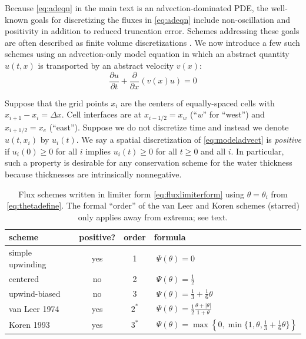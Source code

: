 \documentclass[gmd]{copernicus}   %
\newcommand{\ddt}[1]{\ensuremath{\frac{\partial #1}{\partial t}}}
\newcommand{\ddx}[1]{\ensuremath{\frac{\partial #1}{\partial x}}}
\begin{document}
Because \eqref{eq:adeqn} in the main text is an advection-dominated PDE, the well-known goals for discretizing the fluxes in \eqref{eq:adeqn} include non-oscillation and positivity \citep{HundsdorferVerwer2010} in addition to reduced truncation error.  Schemes addressing these goals are often described as finite volume discretizations \citep{LeVeque}.  We now introduce a few such schemes using an advection-only model equation in which an abstract quantity $u(t,x)$ is transported by an abstract velocity $v(x)$:
\begin{equation} \label{eq:modeladvect}
\ddt{u} + \ddx{}\left(v(x) u\right) = 0
\end{equation}

Suppose that the grid points $x_i$ are the centers of equally-spaced cells with $x_{i+1}-x_i=\Delta x$.  Cell interfaces are at $x_{i-1/2}=x_w$ (``\emph{w}'' for ``west'') and $x_{i+1/2}=x_e$ (``east'').  Suppose we do not discretize time and instead we denote $u(t,x_i)$ by $u_i(t)$.  We say a spatial discretization of \eqref{eq:modeladvect} is \emph{positive} if $u_i(0) \ge 0$ for all $i$ implies $u_i(t)\ge 0$ for all $t\ge 0$ and all $i$.  In particular, such a property is desirable for any conservation scheme for the water thickness because thicknesses are intrinsically nonnegative.

\begin{table}[ht]
  \centering
  \caption{Flux schemes written in limiter form \eqref{eq:fluxlimiterform} using $\theta=\theta_i$ from \eqref{eq:thetadefine}. The formal ``order'' of the van Leer and Koren schemes (starred) only applies away from extrema; see text.}
  \begin{tabular}{lccl}
    \textbf{scheme} & \textbf{positive?} & \textbf{order} & \textbf{formula} \\
\hline
    simple upwinding & yes & 1 & $\phantom{\Big|}\Psi(\theta) = 0$ \\
    centered         & no  & 2 & $\phantom{\Big|}\Psi(\theta) = \frac{1}{2}$  \\
    upwind-biased    & no  & 3 & $\phantom{\Big|}\Psi(\theta) = \frac{1}{3}+\frac{1}{6} \theta$  \\
    van Leer 1974    & yes & $2^*$ & $\phantom{\Big|}\Psi(\theta) = \frac{1}{2} \frac{\theta + |\theta|}{1+\theta}$  \\
    Koren 1993       & yes & $3^*$ & $\phantom{\Big|}\Psi(\theta) = \max\left\{0,\min\{1,\theta,\frac{1}{3}+\frac{1}{6} \theta\}\right\}$  \\
    \hline
  \end{tabular}
 \label{tab:fluxlimiters}
\end{table}
\end{document}

